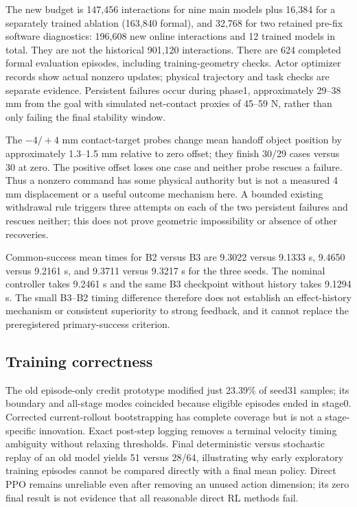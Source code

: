 The new budget is 147,456 interactions for nine main models plus 16,384 for a separately trained ablation (163,840 formal), and 32,768 for two retained pre-fix software diagnostics: 196,608 new online interactions and 12 trained models in total. They are not the historical 901,120 interactions. There are 624 completed formal evaluation episodes, including training-geometry checks. Actor optimizer records show actual nonzero updates; physical trajectory and task checks are separate evidence. Persistent failures occur during phase1, approximately 29--38 mm from the goal with simulated net-contact proxies of 45--59 N, rather than only failing the final stability window.

The $-4/+4$ mm contact-target probes change mean handoff object position by approximately 1.3--1.5 mm relative to zero offset; they finish 30/29 cases versus 30 at zero. The positive offset loses one case and neither probe rescues a failure. Thus a nonzero command has some physical authority but is not a measured 4 mm displacement or a useful outcome mechanism here. A bounded existing withdrawal rule triggers three attempts on each of the two persistent failures and rescues neither; this does not prove geometric impossibility or absence of other recoveries.

Common-success mean times for B2 versus B3 are 9.3022 versus 9.1333 s, 9.4650 versus 9.2161 s, and 9.3711 versus 9.3217 s for the three seeds. The nominal controller takes 9.2461 s and the same B3 checkpoint without history takes 9.1294 s. The small B3--B2 timing difference therefore does not establish an effect-history mechanism or consistent superiority to strong feedback, and it cannot replace the preregistered primary-success criterion.


\subsection{Training correctness}
The old episode-only credit prototype modified just 23.39\% of seed31 samples; its boundary and all-stage modes coincided because eligible episodes ended in stage0. Corrected current-rollout bootstrapping has complete coverage but is not a stage-specific innovation. Exact post-step logging removes a terminal velocity timing ambiguity without relaxing thresholds. Final deterministic versus stochastic replay of an old model yields 51 versus 28/64, illustrating why early exploratory training episodes cannot be compared directly with a final mean policy. Direct PPO remains unreliable even after removing an unused action dimension; its zero final result is not evidence that all reasonable direct RL methods fail.
